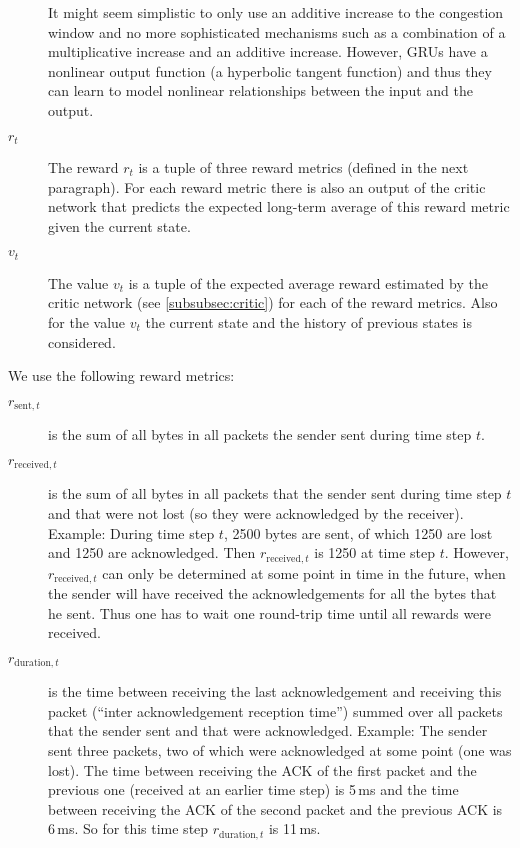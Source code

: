 \documentclass[10pt,sigconf,anonymous]{acmart}
\begin{document}
\begin{description}
It might seem simplistic to only use an additive increase to the congestion window and no more sophisticated mechanisms such as a combination of a multiplicative increase and an additive increase. However, GRUs have a nonlinear output function (a hyperbolic tangent function) and thus they can learn to model nonlinear relationships between the input and the output. 
\item[$\textit{r}_t$] The reward $r_t$ is a tuple of three reward metrics (defined in the next paragraph). 
For each reward metric there is also an output of the critic network that predicts the expected long-term average of this reward metric given the current state. 
\item[$\textit{v}_t$] The value $v_t$ is a tuple of the expected average reward estimated by the critic network (see \autoref{subsubsec:critic}) for each of the reward metrics. Also for the value $v_t$ the current state and the history of previous states is considered. 
\end{description}

We use the following reward metrics: 
\begin{description}
\item[$\textit{r}_{\text{sent},t}$] is the sum of all bytes in all packets the sender sent during time step $t$. 
\item[$\textit{r}_{\text{received},t}$] is the sum of all bytes in all packets that the sender sent during time step $t$ and that were not lost (so they were acknowledged by the receiver). Example: During time step $t$, 2500 bytes are sent, of which 1250 are lost and 1250 are acknowledged. Then $\textit{r}_{\text{received},t}$ is 1250 at time step $t$. However, $\textit{r}_{\text{received},t}$ can only be determined at some point in time in the future, when the sender will have received the acknowledgements for all the bytes that he sent. Thus one has to wait one round-trip time until all rewards were received. 
\item[$\textit{r}_{\text{duration},t}$] is the time between receiving the last acknowledgement and receiving this packet (``inter acknowledgement reception time'') summed over all packets that the sender sent and that were acknowledged. Example: The sender sent three packets, two of which were acknowledged at some point (one was lost). The time between receiving the ACK of the first packet and the previous one (received at an earlier time step) is 5\,ms and the time between receiving the ACK of the second packet and the previous ACK is 6\,ms. So for this time step $\textit{r}_{\text{duration},t}$ is 11\,ms.
\end{description}
\end{document}
